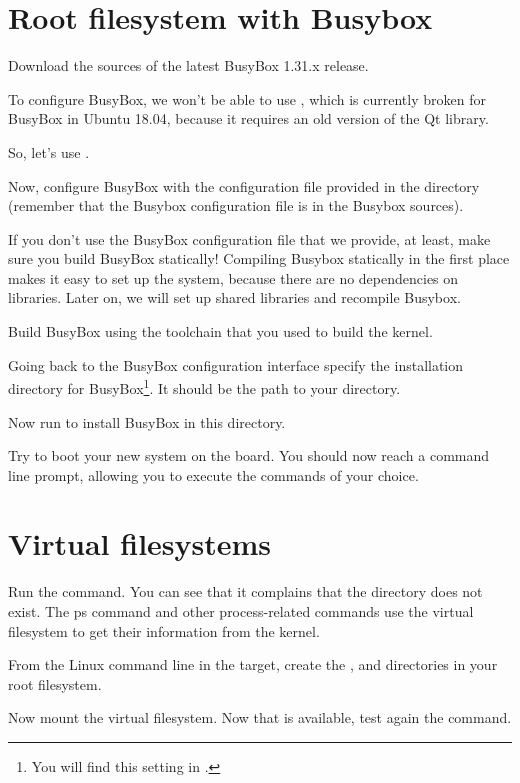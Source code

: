 \section{Root filesystem with Busybox}

Download the sources of the latest BusyBox 1.31.x release.

To configure BusyBox, we won't be able to use ,
which is currently broken for BusyBox in Ubuntu 18.04,
because it requires an old version of the Qt library.

So, let's use .

Now, configure BusyBox with the configuration file provided in the
 directory (remember that the Busybox configuration file
is  in the Busybox sources).

If you don't use the BusyBox configuration file that we provide, at least,
make sure you build BusyBox statically! Compiling Busybox
statically in the first place makes it easy to set up the system,
because there are no dependencies on libraries. Later on, we will set
up shared libraries and recompile Busybox.

Build BusyBox using the toolchain that you used to build the kernel.

Going back to the BusyBox configuration interface
specify the installation directory for BusyBox\footnote{You will find
this setting in .}.
It should be the path to your  directory.

Now run  to install BusyBox in this directory.

Try to boot your new system on the board. You should now reach a
command line prompt, allowing you to execute the commands of your
choice.

\section{Virtual filesystems}

Run the  command. You can see that it complains that the
 directory does not exist. The ps command and other
process-related commands use the  virtual filesystem to get
their information from the kernel.

From the Linux command line in the target, create the ,
 and  directories in your root filesystem.

Now mount the  virtual filesystem. Now that  is
available, test again the  command.

